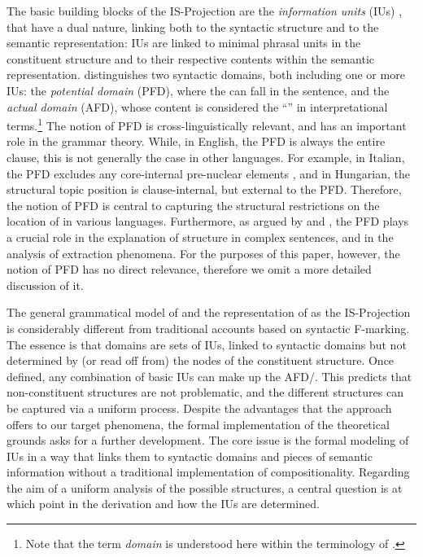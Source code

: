 \documentclass[output=paper,colorlinks,citecolor=brown]{langscibook}
\begin{document}
The basic building blocks of the IS-Projection are the \textit{information units} (IUs) \citep[IUs; see][]{lambrecht:94,vanvalin:05,bentley:23}, that have a dual nature, linking both to the syntactic structure and to the semantic representation: IUs are linked to minimal phrasal units in the constituent structure and to their respective contents within the semantic representation.  distinguishes two syntactic domains, both including one or more IUs: the \textit{potential  domain} (PFD), where the  can fall in the sentence, and the \textit{actual  domain} (AFD), whose content is considered the ``'' in interpretational terms.\footnote{Note that the term \textit{ domain} is understood here within the terminology of .}
The notion of PFD is cross-linguistically relevant, and has an important role in the grammar theory. While, in English, the PFD is always the entire clause, this is not generally the case in other languages. For example, in Italian, the PFD excludes any core-internal pre-nuclear elements \citep[][]{vvlp:97,bentley:08}, and in Hungarian, the structural topic position is clause-internal, but external to the PFD. Therefore, the notion of PFD is central to capturing the structural restrictions on the location of  in various languages. Furthermore, as argued by \citet{vanvalin:05} and \citet{shimojo:23}, the PFD plays a crucial role in the explanation of  structure in complex sentences, and in the analysis of extraction phenomena. For the purposes of this paper, however, the notion of PFD has no direct relevance, therefore we omit a more detailed discussion of it. 

The general grammatical model of  and the representation of  as the IS-Projection is considerably different from traditional accounts based on syntactic F-marking. The essence is that  domains are sets of IUs, linked to syntactic domains  but not determined by (or read off from) the nodes of the constituent structure. Once defined, any combination of basic IUs can make up the AFD/. This predicts that non-constituent  structures are not problematic, and the different  structures can be captured via a uniform process. Despite the advantages that the  approach offers to our target phenomena, the formal implementation of the theoretical grounds asks for a further development. The core issue is the formal modeling of IUs in a way that links them to syntactic domains and pieces of semantic information without a traditional implementation of compositionality. Regarding the aim of a uniform analysis of the possible  structures, a central question is at which point in the derivation and how the IUs are determined. 
\end{document}
